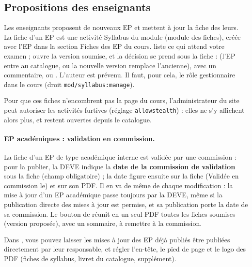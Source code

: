 \documentclass[11pt,a4paper]{article}
\begin{document}
\subsection{Propositions des enseignants}

Les enseignants proposent de nouveaux EP et mettent à jour la fiche des leurs. La fiche d'un EP
est une activité \og Syllabus du module\fg{} (module des fiches), créée avec l'EP dans la
section \og Fiches des EP\fg{} du cours.  liste ce qui attend
votre examen ;  ouvre la version soumise, et la décision se prend sous la fiche :
 (l'EP entre au catalogue, ou la nouvelle version remplace l'ancienne),
 avec un commentaire, ou . L'auteur est prévenu.
Il faut, pour cela, le rôle gestionnaire dans le cours (droit \texttt{mod/syllabus:manage}).

Pour que ces fiches n'encombrent pas la page du cours, l'administrateur du site peut autoriser
les activités furtives (réglage \texttt{allowstealth}) : elles ne s'y affichent alors plus, et
restent ouvertes depuis le catalogue.


\paragraph{EP académiques : validation en commission.} La fiche d'un EP de type
\og académique interne\fg{} est validée par une commission : pour la publier, la DEVE indique
la \textbf{date de la commission de validation} sous la fiche (champ obligatoire) ; la date
figure ensuite sur la fiche (\og Validée en commission le\fg{}) et sur son PDF. Il en va de même
de chaque modification : la mise à jour d'un EP académique passe toujours par la DEVE, même si
la publication directe des mises à jour est permise, et sa publication porte la date de sa
commission. Le bouton  de 
réunit en un seul PDF toutes les fiches soumises (version proposée), avec un sommaire, à
remettre à la commission.

Dans , vous pouvez laisser les mises à jour des EP déjà
publiés être publiées directement par leur responsable, et régler l'en-tête, le pied de page
et le logo des PDF (fiches de syllabus, livret du catalogue, supplément).
\end{document}
